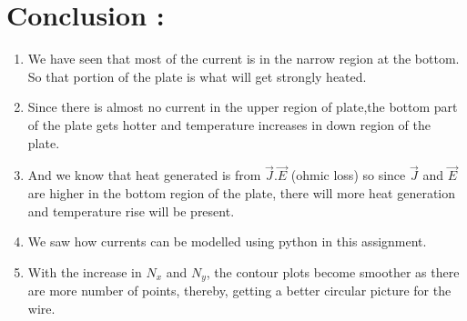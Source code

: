 \documentclass{article}
\begin{document}
\section{Conclusion :}
  
  \begin{enumerate}
  \item
    We have seen that most of the current is in the narrow region at the
    bottom. So that portion of the plate is what will get strongly heated.
  \item
    Since there is almost no current in the upper region of plate,the
    bottom part of the plate gets hotter and temperature increases in down
    region of the plate.
  \item
    And we know that heat generated is from \(\vec{J}.\vec{E}\) (ohmic
    loss) so since \(\vec{J}\) and \(\vec{E}\) are higher in the bottom
    region of the plate, there will more heat generation and temperature
    rise will be present.
  \item
    We saw how currents can be modelled using python in this assignment. 
  \item
    With the increase in $N_x$ and $N_y$, the contour plots become smoother as there are more number of points, thereby, getting a better circular picture for the wire.  
  \end{enumerate}
  
\end{document}
